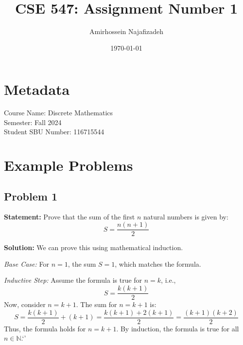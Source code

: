 \documentclass[12pt]{article}
\begin{document}
\title{CSE 547: Assignment Number 1}
\author{Amirhossein Najafizadeh}
\date{\today}
\maketitle

\section*{Metadata}
Course Name: Discrete Mathematics \\
Semester: Fall 2024 \\
Student SBU Number: 116715544

\section{Example Problems}
\subsection{Problem 1}
\textbf{Statement:} Prove that the sum of the first $n$ natural numbers is given by:
\[
S = \frac{n(n+1)}{2}
\]

\textbf{Solution:} We can prove this using mathematical induction.

\textit{Base Case:} For $n = 1$, the sum $S = 1$, which matches the formula.

\textit{Inductive Step:} Assume the formula is true for $n = k$, i.e.,
\[
S = \frac{k(k+1)}{2}
\]
Now, consider $n = k+1$. The sum for $n = k+1$ is:
\[
S = \frac{k(k+1)}{2} + (k+1) = \frac{k(k+1) + 2(k+1)}{2} = \frac{(k+1)(k+2)}{2}
\]
Thus, the formula holds for $n = k+1$. By induction, the formula is true for all $n \in \mathbb{N}$.`'
\end{document}
